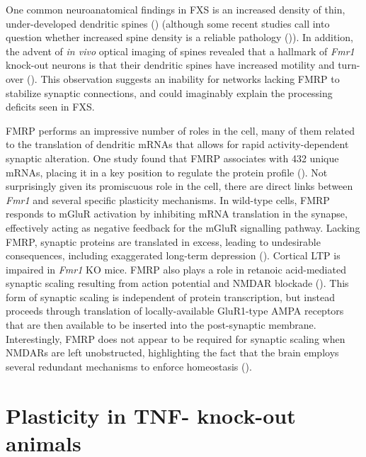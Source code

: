 One common neuroanatomical findings in FXS is an increased density of thin, under-developed dendritic spines (\cite{Hinton1991, Comery1997, Dolen2007, Liu2011}) (although some recent studies call into question whether increased spine density is a reliable pathology (\cite{Cruz-Martin2010, Harlow2010, Meredith2007})). In addition, the advent of \textit{in vivo} optical imaging of spines revealed that a hallmark of \textit{Fmr1} knock-out neurons is that their dendritic spines have increased motility and turn-over (\cite{Cruz-Martin2010, Pan2010}). This observation suggests an inability for networks lacking FMRP to stabilize synaptic connections, and could imaginably explain the processing deficits seen in FXS.

FMRP performs an impressive number of roles in the cell, many of them related to the translation of dendritic mRNAs that allows for rapid activity-dependent synaptic alteration. One study found that FMRP associates with 432 unique mRNAs, placing it in a key position to regulate the protein profile (\cite{Brown2001}). Not surprisingly given its promiscuous role in the cell, there are direct links between \textit{Fmr1} and several specific plasticity mechanisms. In wild-type cells, FMRP responds to mGluR activation by inhibiting mRNA translation in the synapse, effectively acting as negative feedback for the mGluR signalling pathway. Lacking FMRP, synaptic proteins are translated in excess, leading to undesirable consequences, including exaggerated long-term depression (\cite{Huber2002, Bear2004}). Cortical LTP is impaired in \textit{Fmr1} KO mice. FMRP also plays a role in retanoic acid-mediated synaptic scaling resulting from action potential and NMDAR blockade (\cite{Soden2010}). This form of synaptic scaling is independent of protein transcription, but instead proceeds through translation of locally-available GluR1-type AMPA receptors that are then available to be inserted into the post-synaptic membrane. Interestingly, FMRP does not appear to be required for synaptic scaling when NMDARs are left unobstructed, highlighting the fact that the brain employs several redundant mechanisms to enforce homeostasis (\cite{Soden2010}).

\section{Plasticity in TNF-\textalpha{} knock-out animals}

